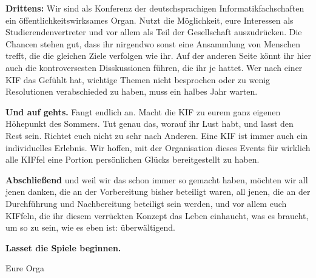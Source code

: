 \textbf{Drittens:}
Wir sind als Konferenz der deutschsprachigen Informatikfachschaften ein öffentlichkeitswirksames Organ.
Nutzt die Möglichkeit, eure Interessen als Studierendenvertreter und vor allem als Teil der Gesellschaft auszudrücken.
Die Chancen stehen gut, dass ihr nirgendwo sonst eine Ansammlung von Menschen trefft, die die gleichen Ziele verfolgen wie ihr.
Auf der anderen Seite könnt ihr hier auch die kontroversesten Disskussionen führen, die ihr je hattet.
Wer nach einer KIF das Gefühlt hat, wichtige Themen nicht besprochen oder zu wenig Resolutionen verabschieded zu haben, muss ein halbes Jahr warten.

\textbf{Und auf gehts.}
Fangt endlich an.
Macht die KIF zu eurem ganz eigenen Höhepunkt des Sommers.
Tut genau das, worauf ihr Lust habt, und lasst den Rest sein.
Richtet euch nicht zu sehr nach Anderen.
Eine KIF ist immer auch ein individuelles Erlebnis.
Wir hoffen, mit der Organisation dieses Events für wirklich alle KIFfel eine Portion persönlichen Glücks bereitgestellt zu haben.

\textbf{Abschließend} und weil wir das schon immer so gemacht haben, möchten wir all jenen danken, die an der Vorbereitung bisher beteiligt waren, all jenen, die an der Durchführung und Nachbereitung beteiligt sein werden, und vor allem euch KIFfeln, die ihr diesem verrückten Konzept das Leben einhaucht, was es braucht, um so zu sein, wie es eben ist: überwältigend.

\textbf{Lasset die Spiele beginnen.}

\vspace{5mm}
\noindent
Eure Orga
